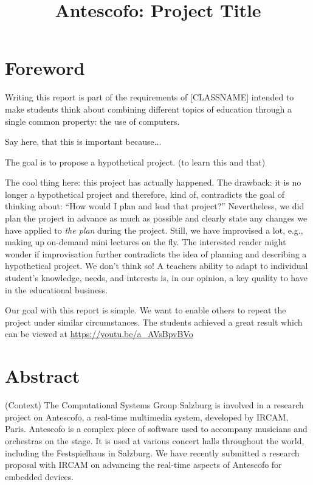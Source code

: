 \documentclass[onecolumn,nocopyrightspace,preprint]{sigplanconf}
\title{Antescofo: Project Title}
\begin{document}
\maketitle

\section{Foreword} 
Writing this report is part of the requirements of [CLASSNAME] intended to
make students think about combining different topics of education through
a single common property: the use of computers.


Say here, that this is important because...

The goal is to propose a hypothetical project. (to learn this and that)

The cool thing here: this project has actually happened. The drawback: it is no longer a hypothetical project
and therefore, kind of, contradicts the goal of thinking about: ``How would I plan and lead that project?''
Nevertheless, we did plan the project in advance as much as possible and clearly state any changes we have applied 
to \textit{the plan} during the project. Still, we have improvised a lot, e.g., making up on-demand mini lectures on the fly.
The interested reader might wonder if improvisation further contradicts the idea of planning and describing a hypothetical project. 
We don't think so! A teachers ability to adapt to individual student's knowledge, needs, and interests is, in our opinion,
a key quality to have in the educational business.

Our goal with this report is simple. We want to enable others to repeat the project under similar circumstances.
The students achieved a great result which can be viewed at \url{https://youtu.be/a_AVsBpvBVo}

\section{Abstract} 

(Context) The Computational Systems Group Salzburg is involved in a research
project on Antescofo, a real-time multimedia system, developed by IRCAM,
Paris. Antescofo is a complex piece of software used to accompany musicians
and orchestras on the stage. It is used at various concert halls throughout
the world, including the Festspielhaus in Salzburg. We have recently submitted
a research proposal with IRCAM on advancing the real-time aspects of Antescofo
for embedded devices.
\end{document}
